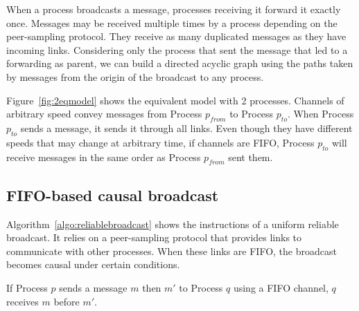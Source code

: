 
When a process broadcasts a message, processes receiving it forward it exactly
once. Messages may be received multiple times by a process depending on the
peer-sampling protocol. They receive as many duplicated messages as they have
incoming links.  Considering only the process that sent the message that led to
a forwarding as parent, we can build a directed acyclic graph using the paths
taken by messages from the origin of the broadcast to any process.

Figure~\ref{fig:2eqmodel} shows the equivalent model with 2 processes. Channels
of arbitrary speed convey messages from Process $p_{from}$ to Process
$p_{to}$. When Process $p_{to}$ sends a message, it sends it through all
links. Even though they have different speeds that may change at arbitrary time,
if channels are FIFO, Process $p_{to}$ will receive messages in the same order as
Process $p_{from}$ sent them.


\subsection{FIFO-based causal broadcast}
\label{subsec:fifobroadcast}

Algorithm~\ref{algo:reliablebroadcast} shows the instructions of a uniform
reliable broadcast. It relies on a peer-sampling protocol that provides links to
communicate with other processes. When these links are FIFO, the broadcast
becomes causal under certain conditions.


\begin{definition}
  If Process $p$ sends a message $m$ then $m'$ to Process $q$ using a FIFO
  channel, $q$ receives $m$ before $m'$.
\end{definition}



